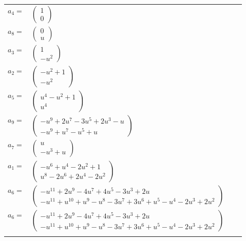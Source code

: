 \documentclass[1p]{elsarticle_modified}
\theoremstyle{definition}
\begin{document}
\begin{tabular}{m{7pt} m{180pt} m{7pt} m{180pt} }
\flushright $a_{4}=$&$\begin{pmatrix}1\\0\end{pmatrix}$ \\
\flushright $a_{8}=$&$\begin{pmatrix}0\\u\end{pmatrix}$ \\
\flushright $a_{3}=$&$\begin{pmatrix}1\\- u^2\end{pmatrix}$ \\
\flushright $a_{2}=$&$\begin{pmatrix}- u^2+1\\- u^2\end{pmatrix}$ \\
\flushright $a_{5}=$&$\begin{pmatrix}u^4- u^2+1\\u^4\end{pmatrix}$ \\
\flushright $a_{9}=$&$\begin{pmatrix}- u^9+2 u^7-3 u^5+2 u^3- u\\- u^9+u^7- u^5+u\end{pmatrix}$ \\
\flushright $a_{7}=$&$\begin{pmatrix}u\\- u^3+u\end{pmatrix}$ \\
\flushright $a_{1}=$&$\begin{pmatrix}- u^6+u^4-2 u^2+1\\u^8-2 u^6+2 u^4-2 u^2\end{pmatrix}$ \\
\flushright $a_{6}=$&$\begin{pmatrix}- u^{11}+2 u^9-4 u^7+4 u^5-3 u^3+2 u\\- u^{11}+u^{10}+u^9- u^8-3 u^7+3 u^6+u^5- u^4-2 u^3+2 u^2\end{pmatrix}$\\ \flushright $a_{6}=$&$\begin{pmatrix}- u^{11}+2 u^9-4 u^7+4 u^5-3 u^3+2 u\\- u^{11}+u^{10}+u^9- u^8-3 u^7+3 u^6+u^5- u^4-2 u^3+2 u^2\end{pmatrix}$\\&\end{tabular}
\end{document}
